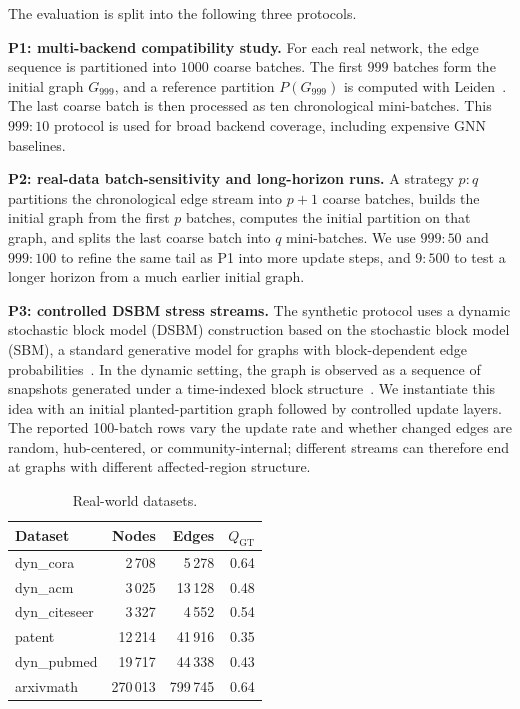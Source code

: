 \documentclass[conference]{IEEEtran}
\theoremstyle{definition}
\begin{document}
The evaluation is split into the following three protocols.

\textbf{P1: multi-backend compatibility study.}
For each real network, the edge sequence is partitioned into $1000$ coarse
batches. The first $999$ batches form the initial graph $G_{999}$, and a
reference partition $P(G_{999})$ is computed with Leiden~\cite{TWE19}. The
last coarse batch is then processed as ten chronological mini-batches. This
$999{:}10$ protocol is used for broad backend coverage, including expensive
GNN baselines.

\textbf{P2: real-data batch-sensitivity and long-horizon runs.}
A strategy $p{:}q$ partitions the chronological edge stream into $p+1$ coarse
batches, builds the initial graph from the first $p$ batches, computes the
initial partition on that graph, and splits the last coarse batch into $q$
mini-batches. We use $999{:}50$ and $999{:}100$ to refine the same tail as P1
into more update steps, and $9{:}500$ to test a longer horizon from a much
earlier initial graph.

\textbf{P3: controlled DSBM stress streams.}
The synthetic protocol uses a dynamic stochastic block model (DSBM) construction
based on the stochastic block model (SBM), a standard generative model for
graphs with block-dependent edge probabilities~\cite{HLL83}. In the dynamic
setting, the graph is observed as a sequence of snapshots generated under a
time-indexed block structure~\cite{XH14}. We instantiate this idea with an
initial planted-partition graph followed by controlled update layers. The
reported 100-batch rows vary the update rate and whether changed edges are
random, hub-centered, or community-internal; different streams can therefore
end at graphs with different affected-region structure.

\begin{table}[ht]
\centering
\caption{Real-world datasets.}
\label{tab:datasets}
\begin{tabular}{lrrr}
\hline
\textbf{Dataset} & \textbf{Nodes} & \textbf{Edges} & \textbf{$Q_{\mathrm{GT}}$} \\
\hline
dyn\_cora      & 2\,708   & 5\,278   & 0.64 \\
dyn\_acm       & 3\,025   & 13\,128  & 0.48 \\
dyn\_citeseer  & 3\,327   & 4\,552   & 0.54 \\
patent         & 12\,214  & 41\,916  & 0.35 \\
dyn\_pubmed    & 19\,717  & 44\,338  & 0.43 \\
arxivmath      & 270\,013 & 799\,745 & 0.64 \\
\hline
\end{tabular}
\end{table}
\end{document}
